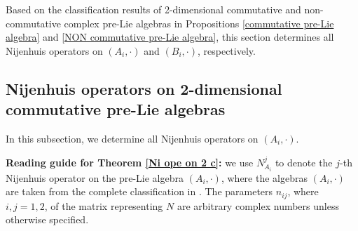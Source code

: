 \documentclass[12pt, reqno]{amsart}
\theoremstyle{plain}
\begin{document}
Based on the classification results of 2-dimensional commutative and non-commutative complex pre-Lie algebras in Propositions \ref{commutative pre-Lie algebra} and \ref{NON commutative pre-Lie algebra}, this section determines all Nijenhuis operators on $(A_i,\cdot)$ and $(B_i,\cdot)$, respectively.


\subsection{Nijenhuis operators on 2-dimensional commutative pre-Lie algebras} In this subsection, we determine all Nijenhuis operators on $(A_i,\cdot)$.

\textbf{Reading guide for Theorem \ref{Ni ope on 2 c}:} we use $N_{A_i}^j$ to denote the $j$-th Nijenhuis operator on the pre-Lie algebra $(A_i, \cdot)$,  where the algebras $(A_i, \cdot)$ are taken from the complete classification in \cite{Bai-Meng}. The parameters $n_{ij}$, where $i,j=1,2$, of the matrix representing $N$ are arbitrary complex numbers unless otherwise specified. 
\end{document}
